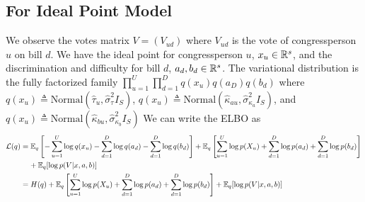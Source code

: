 \documentclass{article}
\begin{document}
\subsection{For Ideal Point Model}
We observe the votes matrix $V = (V_{ud})$ where $V_{ud}$ is the vote of congressperson $u$ on bill $d$. We have the ideal point for congressperson $u$, $x_u \in \mathbb{R}^s$, and the discrimination and difficulty for bill $d$, $a_d,b_d \in \mathbb{R}^s$. The variational distribution is the fully factorized family $\prod_{u=1}^U \prod_{d=1}^D q(x_u)q(a_D)q(b_d)$ where $q(x_u) \triangleq \text{Normal}(\hat{\tau}_u, \hat{\sigma}^2_\tau I_S)$, $q(x_u) \triangleq \text{Normal}(\hat{\kappa}_{au}, \hat{\sigma}^2_{\kappa_a} I_S)$, and $q(x_u) \triangleq \text{Normal}(\hat{\kappa}_{bu}, \hat{\sigma}^2_{\kappa_b} I_S)$
\vskip 10pt
We can write the ELBO as 
\begin{align*}
\mathcal{L}(q) & = \mathbb{E}_q\left[-\sum_{u=1}^U\log q(x_u) - \sum_{d=1}^D \log q(a_d) - \sum_{d=1}^D \log q(b_d)\right] + \mathbb{E}_q\left[\sum_{u=1}^U \log p(X_{u}) +\sum_{d=1}^D \log p(a_d) + \sum_{d=1}^D \log p(b_d)\right]\\
& \;\;\;\; + \mathbb{E}_q[\log p(V|x,a,b)]\\
& = H(q) +  \mathbb{E}_q\left[\sum_{u=1}^U \log p(X_{u}) +\sum_{d=1}^D \log p(a_d) + \sum_{d=1}^D \log p(b_d)\right] + \mathbb{E}_q[\log p(V|x,a,b)]\\
\end{align*}
\end{document}
